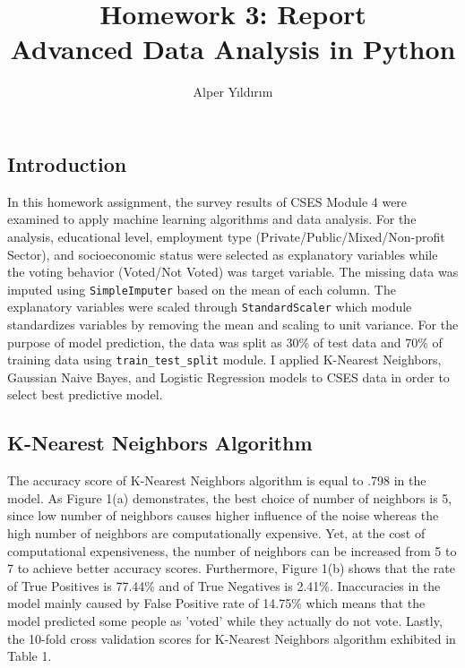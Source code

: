 \documentclass[a4paper]{article}
\title{Homework 3: Report \\ Advanced Data Analysis in Python}
\author{Alper Yıldırım}
\begin{document}
\maketitle

\subsection*{Introduction}
	In this homework assignment, the survey results of CSES Module 4 were examined to apply machine learning algorithms and data analysis. For the analysis, educational level, employment type (Private/Public/Mixed/Non-profit Sector), and socioeconomic status were selected as explanatory variables while the voting behavior (Voted/Not Voted) was target variable. The missing data was imputed using \verb|SimpleImputer| based on the mean of each column. The explanatory variables were scaled through \verb|StandardScaler| which module standardizes variables by removing the mean and scaling to unit variance. For the purpose of model prediction, the data was split as 30\% of test data and 70\% of training data using \verb|train_test_split| module. I applied K-Nearest Neighbors, Gaussian Naive Bayes, and Logistic Regression models to CSES data in order to select best predictive model.

\subsection*{K-Nearest Neighbors Algorithm}

    The accuracy score of K-Nearest Neighbors algorithm is equal to .798 in the model. As Figure 1(a) demonstrates, the best choice of number of neighbors is 5, since low number of neighbors causes higher influence of the noise whereas the high number of neighbors are computationally expensive. Yet, at the cost of computational expensiveness, the number of neighbors can be increased from 5 to 7 to achieve better accuracy scores. Furthermore, Figure 1(b) shows that the rate of True Positives is 77.44\% and of True Negatives is 2.41\%. Inaccuracies in the model mainly caused by False Positive rate of 14.75\% which means that the model predicted some people as 'voted' while they actually do not vote. Lastly, the 10-fold cross validation scores for K-Nearest Neighbors algorithm exhibited in Table 1.
    
\end{document}

